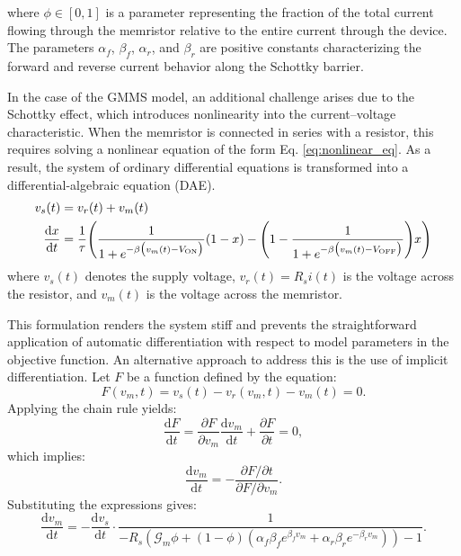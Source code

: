 \documentclass[11pt, oneside]{article}
\newcommand{\G}{\mathcal{G}}
\newcommand{\von}{V_{\rm ON}}
\newcommand{\voff}{V_{\rm OFF}}
\newcommand{\dert}[1]{\frac{{\rm d} {#1}}{{\rm d} t} }
\begin{document}
where \(\phi \in [0,1]\) is a parameter representing the fraction of the total current flowing through the memristor relative to the entire current through the device. The parameters \(\alpha_f\), \(\beta_f\), \(\alpha_r\), and \(\beta_r\) are positive constants characterizing the forward and reverse current behavior along the Schottky barrier.


In the case of the GMMS model, an additional challenge arises due to the Schottky effect, which introduces nonlinearity into the current–voltage characteristic. When the memristor is connected in series with a resistor, this requires solving a nonlinear equation of the form Eq. \eqref{eq:nonlinear_eq}. As a result, the system of ordinary differential equations is transformed into a differential-algebraic equation (DAE).
\begin{align}
    v_s(t)   & = v_r(t) + v_m(t)                                                                                                                                    \\
    \dert{x} & =  \frac{1}{\tau} \Bigg( \frac{1}{1+e^{-\beta \big(v_m(t)-\von\big)}} (1-x)  -\Bigg(1- \frac{1}{1+e^{-\beta \big(v_m(t)-\voff\big)}} \Bigg) x \Bigg) \\
    \label{eq:nonlinear_eq}
\end{align}
where \(v_s(t)\) denotes the supply voltage, \(v_r(t) = R_s i(t)\) is the voltage across the resistor, and \(v_m(t)\) is the voltage across the memristor.

This formulation renders the system stiff and prevents the straightforward application of automatic differentiation with respect to model parameters in the objective function. An alternative approach to address this is the use of implicit differentiation.
Let \(F\) be a function defined by the equation:
\begin{equation}
    F(v_m, t) = v_s(t) - v_r(v_m, t) - v_m(t) = 0.
\end{equation}
Applying the chain rule yields:
\begin{equation}
    \frac{\mathrm{d} F}{\mathrm{d} t} = \frac{\partial F}{\partial v_m} \frac{\mathrm{d} v_m}{\mathrm{d} t} + \frac{\partial F}{\partial t} = 0,
\end{equation}
which implies:
\begin{equation}
    \frac{\mathrm{d} v_m}{\mathrm{d} t} = - \frac{\partial F / \partial t}{\partial F / \partial v_m}.
\end{equation}
Substituting the expressions gives:
\begin{equation}
    \frac{\mathrm{d} v_m}{\mathrm{d} t} = - \frac{\mathrm{d} v_s}{\mathrm{d} t} \cdot \frac{1}{ - R_s \left( \G_{m} \phi + (1 - \phi) \left( \alpha_f \beta_f e^{\beta_f v_m} + \alpha_r \beta_r e^{-\beta_r v_m} \right) \right) - 1 }.
\end{equation}
\end{document}

